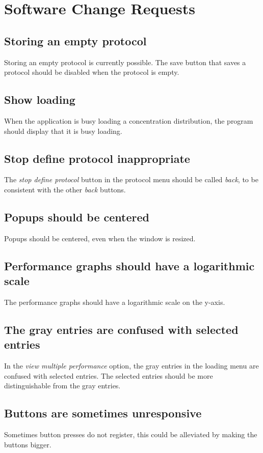 \chapter{Software Change Requests}
\label{chap:changes}

\section*{Storing an empty protocol}
Storing an empty protocol is currently possible. The save button that saves a protocol should be disabled when the protocol is empty.

\section*{Show loading}
When the application is busy loading a concentration distribution, the program should display that it is busy loading.

\section*{Stop define protocol inappropriate}
The \emph{stop define protocol} button in the protocol menu should be called \emph{back}, to be consistent with the other \emph{back} buttons.

\section*{Popups should be centered}
Popups should be centered, even when the window is resized.

\section*{Performance graphs should have a logarithmic scale}
The performance graphs should have a logarithmic scale on the y-axis.

\section*{The gray entries are confused with selected entries}
In the \emph{view multiple performance} option, the gray entries in the loading menu are confused with selected entries. The selected entries should be more distinguishable from the gray entries.

\section*{Buttons are sometimes unresponsive}
Sometimes button presses do not register, this could be alleviated by making the buttons bigger.

